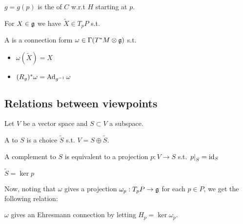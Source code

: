 \documentclass{article}
\begin{document}
\begin{definition}
$g =g(p)$ is the  of $C$ w.r.t $H$ starting at $p$.  
\end{definition}

\begin{definition}
For $X \in \mathfrak{g}$ we have $\tilde{X}\in T_pP$ s.t. 
\end{definition}

\begin{definition}
A  is a connection form $\omega \in \Gamma(T^\ast M \otimes \mathfrak{g})$ s.t. 
\begin{itemize}
    \item $\omega(\tilde{X}) = X$
    \item $(R_g)^\ast \omega = \operatorname{Ad}_{g^{-1}}\omega$
\end{itemize}
\end{definition}

\subsection{Relations between viewpoints}
Let $V$ be a vector space and $S \subset V$ a subspace. 

\begin{definition}
A  to $S$ is a choice $\tilde{S}$ s.t. $V = S \oplus \tilde{S}$. \end{definition}

\begin{lemma}
A complement to $S$ is equivalent to a projection $p: V \to S$ s.t. $\left. p \right\rvert_{S} = \operatorname{id}_S$
\end{lemma}
\begin{corollary}
$\tilde{S}=\ker p$ 
\end{corollary}

Now, noting that $\omega$ gives a projection $\omega_p : T_pP \to \mathfrak{g}$ for each $p \in P$, we get the following relation:

\begin{prop}
$\omega$ gives an Ehresmann connection by letting $H_p = \ker \omega_p$. 
\end{prop} 
\end{document}
